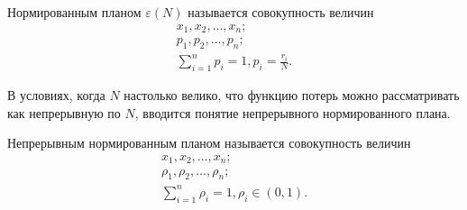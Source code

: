 	\begin{definition}
		Нормированным планом $\varepsilon(N)$ называется совокупность величин
		\begin{gather*}
			x_1, x_2, \dots, x_n;\\
			p_1, p_2, \dots, p_n;\\
			\sum_{i = 1}^n p_i = 1, p_i = \frac {r_i} {N}.
		\end{gather*}
	\end{definition}
	
	В условиях, когда  $N$ настолько велико, что функцию потерь можно рассматривать как непрерывную по $N$, вводится понятие непрерывного нормированного плана.
	\begin{definition}
		Непрерывным нормированным планом называется совокупность величин
		\begin{gather*}
			x_1, x_2, \dots, x_n;\\
			\rho_1, \rho_2, \dots, \rho_n;\\
			\sum_{i = 1}^n \rho_i = 1, \rho_i \in (0, 1).
		\end{gather*}
	\end{definition}